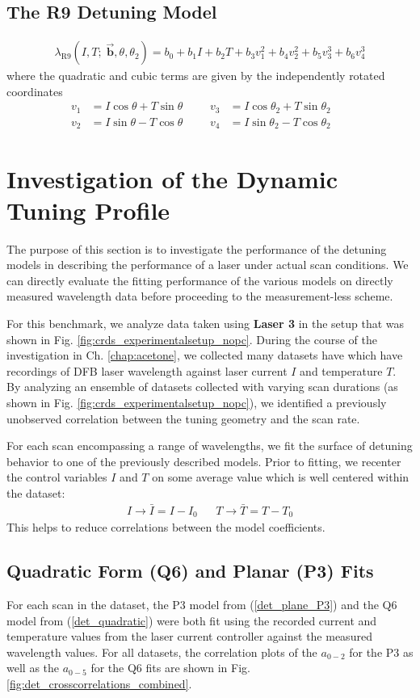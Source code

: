 \documentclass[12pt]{report}
\begin{document}
	\subsection{The R9 Detuning Model}
	\begin{align} \label{det_model_R9}
		\lambda_\mathrm{R9}(I, T;\; \vec{\textbf{b}},\theta, \theta_2) = b_0 + b_1 I + b_2 T + b_3 v_1^2 + b_4 v_2^2 + b_5 v_3^3 + b_6 v_4^3
	\end{align}
	where the quadratic and cubic terms are given by the independently rotated coordinates
	\begin{align}
		v_1 &= I\cos\theta + T\sin\theta &&& v_3 &= I\cos\theta_2 + T\sin\theta_2 && \nonumber\\
		v_2 &= I\sin\theta - T\cos\theta &&& v_4 &= I\sin\theta_2 - T\cos\theta_2 &&
	\end{align}
	\section{Investigation of the Dynamic Tuning Profile}
	The purpose of this section is to investigate the performance of the detuning models in describing the performance of a laser under actual scan conditions. We can directly evaluate the fitting performance of the various models on directly measured wavelength data before proceeding to the measurement-less scheme.
	
	For this benchmark, we analyze data taken using \textbf{Laser 3} in the setup that was shown in Fig. \ref{fig:crds_experimentalsetup_nopc}. During the course of the investigation in Ch. \ref{chap:acetone}, we collected many datasets have which have recordings of DFB laser wavelength against laser current $I$ and temperature $T$. By analyzing an ensemble of datasets collected with varying scan durations (as shown in Fig. \ref{fig:crds_experimentalsetup_nopc}), we identified a previously unobserved correlation between the tuning geometry and the scan rate.
	
	For each scan encompassing a range of wavelengths, we fit the surface of detuning behavior to one of the previously described models. Prior to fitting, we recenter the control variables $I$ and $T$ on some average value which is well centered within the dataset:
	\begin{align}
		I \rightarrow \bar{I} =  I - I_0 && T \rightarrow \bar{T} =  T - T_0
	\end{align}
	This helps to reduce correlations between the model coefficients.
	
	\subsection{Quadratic Form (Q6) and Planar (P3) Fits}
	For each scan in the dataset, the P3 model from (\ref{det_plane_P3}) and the Q6 model from (\ref{det_quadratic}) were both fit using the recorded current and temperature values from the laser current controller against the measured wavelength values. For all datasets, the correlation plots of the $a_{0-2}$ for the P3 as well as the $a_{0-5}$ for the Q6 fits are shown in Fig. \ref{fig:det_crosscorrelations_combined}.
	
\end{document}
